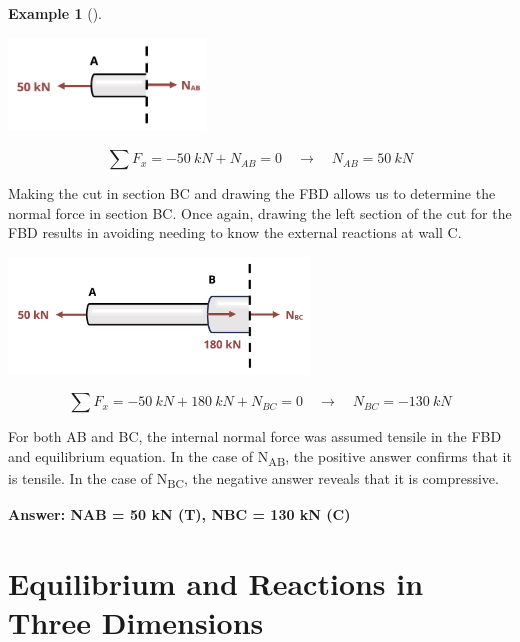 \documentclass[
  letterpaper,
  DIV=11,
  numbers=noendperiod]{scrreprt}
\theoremstyle{definition}
\newtheorem{example}{Example}[chapter]
\theoremstyle{remark}
\begin{document}
\begin{tcolorbox}
\begin{example}[]
\begin{tcolorbox}
\begin{center}
\includegraphics[width=2.07292in,height=\textheight]{images/Updated CH1 examples/example 1.5 part 2.png}
\end{center}

\[
\sum F_x=-50{~kN}+N_{AB}=0 \quad\rightarrow\quad N_{AB}=50{~kN}
\]

Making the cut in section BC and drawing the FBD allows us to determine
the normal force in section BC. Once again, drawing the left section of
the cut for the FBD results in avoiding needing to know the external
reactions at wall C.

\begin{center}
\includegraphics[width=3.15625in,height=\textheight]{images/Updated CH1 examples/example 1.5 part 3.png}
\end{center}

\[
\sum F_x=-50{~kN}+180{~kN}+N_{BC}=0 \quad\rightarrow\quad N_{BC}=-130{~kN}
\]

For both AB and BC, the internal normal force was assumed tensile in the
FBD and equilibrium equation. In the case of N\textsubscript{AB}, the
positive answer confirms that it is tensile. In the case of
N\textsubscript{BC}, the negative answer reveals that it is compressive.

\textbf{Answer: NAB = 50 kN (T), NBC = 130 kN (C)}

\end{tcolorbox}

\end{example}

\end{tcolorbox}

\section{Equilibrium and Reactions in Three Dimensions}\label{sec-1.3}
\end{document}
